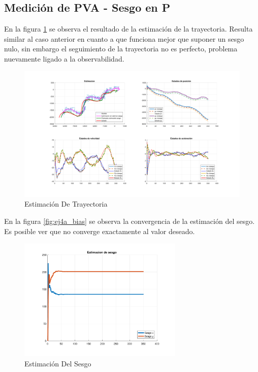 \subsection{Medición de PVA - Sesgo en P}

	En la figura \ref{fig:ej4b} se observa el resultado de la estimación de la trayectoria. Resulta similar al caso anterior en cuanto a que funciona mejor que suponer un sesgo nulo, sin embargo el seguimiento de la trayectoria no es perfecto, problema nuevamente ligado a la observabilidad.

	\begin{figure}[H]
		\centering
		\includegraphics[scale=0.5,trim={6,5cm 0 0 0}]{Figuras/graf_ej4b.pdf}
		\caption{Estimación De Trayectoria}
		\label{fig:ej4b}
	\end{figure}
	
	En la figura \ref{fig:ej4a_bias} se observa la convergencia de la estimación del sesgo. Es posible ver que no converge exactamente al valor deseado.
	
	\begin{figure}[H]
		\centering
		\includegraphics[width=0.7\textwidth,keepaspectratio]{Figuras/bias_ej4b.pdf}
		\caption{Estimación Del Sesgo}
		\label{fig:ej4b_bias}
	\end{figure}
	
